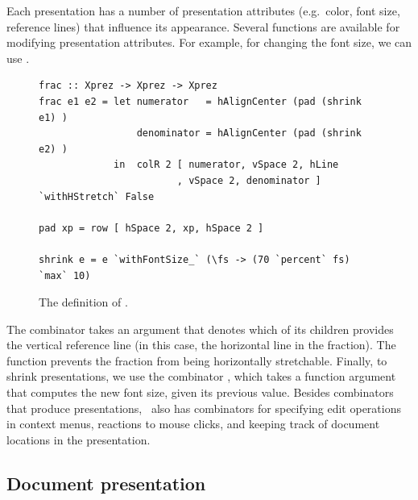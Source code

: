 \documentclass{article}[10pt]
\begin{document}
\begin{center}
\end{center}
\bc
Each presentation has a number of presentation attributes (e.g.\ color, font size, reference lines) that influence its appearance. Several functions are available for modifying presentation attributes. For example, for changing the font size, we can use . 
\ec


\begin{figure}
\begin{center}
\begin{footnotesize}
\begin{verbatim}
frac :: Xprez -> Xprez -> Xprez
frac e1 e2 = let numerator   = hAlignCenter (pad (shrink e1) )
                 denominator = hAlignCenter (pad (shrink e2) )
             in  colR 2 [ numerator, vSpace 2, hLine
                        , vSpace 2, denominator ] `withHStretch` False
                        
pad xp = row [ hSpace 2, xp, hSpace 2 ]

shrink e = e `withFontSize_` (\fs -> (70 `percent` fs) `max` 10)
\end{verbatim}
\end{footnotesize}
\caption{The definition of .} \label{fig:xprezFrac} 
\end{center}
\end{figure}


The  combinator takes an argument that denotes which of its children provides the vertical reference line (in this case, the horizontal line in the fraction). The  function prevents the fraction from being horizontally stretchable. Finally, to shrink presentations, we use the combinator , which takes a function argument that computes the new font size, given its previous value. Besides combinators that produce presentations, \Xprez\ also has combinators for specifying edit operations in context menus, reactions to mouse clicks, and keeping track of document locations in the presentation.


\subsection{Document presentation}
\end{document}
